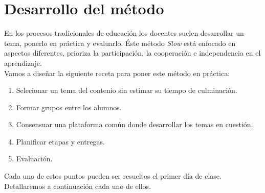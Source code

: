 \section{Desarrollo del m\'etodo}
En los procesos tradicionales de educaci\'on los docentes suelen desarrollar un tema, ponerlo en pr\'actica y evaluarlo. \'Este m\'etodo \textit{Slow}
est\'a enfocado en aspectos diferentes, prioriza la participaci\'on, la cooperaci\'on e independencia en el aprendizaje.\\
Vamos a dise\~nar la siguiente receta para poner este m\'etodo en pr\'actica:
\begin{enumerate}
 \item Selecionar un tema del contenio sin estimar su tiempo de culminaci\'on.
 \item Formar grupos entre los alumnos.
 \item Consensuar una plataforma com\'un donde desarrollar los temas en cuesti\'on.
 \item Planificar etapas y entregas.
 \item Evaluaci\'on.
\end{enumerate}
Cada uno de estos puntos pueden ser resueltos el primer d\'ia de clase. Detallaremos a continuaci\'on cada uno de ellos.
